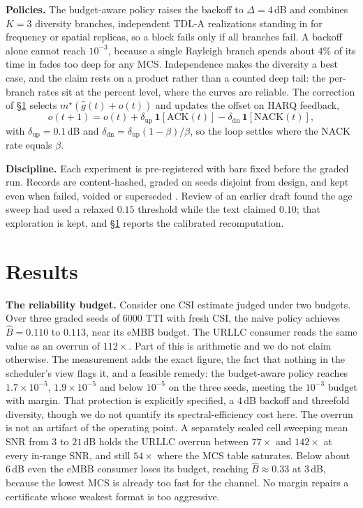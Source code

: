 \documentclass[conference]{IEEEtran}
\begin{document}
\textbf{Policies.} The budget-aware policy raises the backoff to
$\Delta=4$\,dB and combines $K{=}3$ diversity branches, independent TDL-A
realizations standing in for frequency or spatial replicas, so a block fails
only if all branches fail. A backoff alone cannot reach $10^{-3}$, because a
single Rayleigh branch spends about $4\%$ of its time in fades too deep for any
MCS. Independence makes the diversity a best case, and the claim rests on a
product rather than a counted deep tail: the per-branch rates sit at the percent
level, where the curves are reliable. The correction of \S\ref{sec:results}
selects $m^\star(\hat{g}(t)+o(t))$ and updates the offset on HARQ feedback,
\begin{equation}
o(t{+}1)=o(t)+\delta_{\mathrm{up}}\,\mathbf{1}[\text{ACK}(t)]
-\delta_{\mathrm{dn}}\,\mathbf{1}[\text{NACK}(t)],
\label{eq:olla}
\end{equation}
with $\delta_{\mathrm{up}}=0.1$\,dB and
$\delta_{\mathrm{dn}}=\delta_{\mathrm{up}}(1-\beta)/\beta$, so the loop settles
where the NACK rate equals $\beta$.

\textbf{Discipline.} Each experiment is pre-registered with bars fixed before
the graded run. Records are content-hashed, graded on seeds disjoint from
design, and kept even when failed, voided or superseded \cite{otcampaigns}.
Review of an earlier draft found the age sweep had used a relaxed $0.15$
threshold while the text claimed $0.10$; that exploration is kept, and
\S\ref{sec:results} reports the calibrated recomputation.

\section{Results}
\label{sec:results}
\textbf{The reliability budget.} Consider one CSI estimate judged under two
budgets. Over three graded seeds of $6000$ TTI with fresh CSI, the naive policy
achieves $\widehat{B}=0.110$ to $0.113$, near its eMBB budget. The URLLC
consumer reads the same value as an overrun of $112\times$. Part of this is
arithmetic and we do not claim otherwise. The measurement adds the exact figure,
the fact that nothing in the scheduler's view flags it, and a feasible remedy:
the budget-aware policy reaches $1.7\times10^{-5}$,
$1.9\times10^{-5}$ and below $10^{-5}$ on the three seeds, meeting the $10^{-3}$
budget with margin. That protection is explicitly specified, a $4$\,dB backoff
and threefold diversity, though we do not quantify its spectral-efficiency cost
here. The overrun is not an artifact of the operating point. A separately sealed
cell sweeping mean SNR from $3$ to $21$\,dB holds the URLLC overrun between
$77\times$ and $142\times$ at every in-range SNR, and still $54\times$ where the
MCS table saturates. Below about $6$\,dB even the eMBB consumer loses its
budget, reaching $\widehat{B}\approx 0.33$ at $3$\,dB, because the lowest MCS is
already too fast for the channel. No margin repairs a certificate whose weakest
format is too aggressive.
\end{document}
